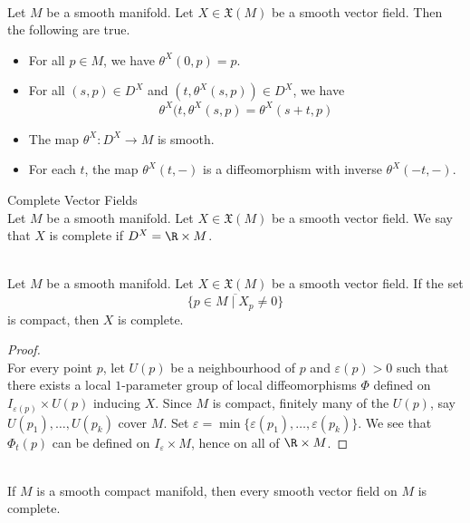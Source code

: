 \documentclass[a4paper]{article}
\begin{document}
\begin{prp}{}{}\\
Let $M$ be a smooth manifold. Let $X\in\mathfrak{X}(M)$ be a smooth vector field. Then the following are true. 
\begin{itemize}
\item For all $p\in M$, we have $\theta^X(0,p)=p$. 
\item For all $(s,p)\in D^X$ and $(t,\theta^X(s,p))\in D^X$, we have $$\theta^X(t,\theta^X(s,p)=\theta^X(s+t,p)$$
\item The map $\theta^X:D^X\to M$ is smooth. 
\item For each $t$, the map $\theta^X(t,-)$ is a diffeomorphism with inverse $\theta^X(-t,-)$. 
\end{itemize}
\end{prp}

\begin{defn}{Complete Vector Fields}{}\\
Let $M$ be a smooth manifold. Let $X\in\mathfrak{X}(M)$ be a smooth vector field. We say that $X$ is complete if $D^X=\R\times M$. 
\end{defn}

\begin{prp}{}{}\\
Let $M$ be a smooth manifold. Let $X\in\mathfrak{X}(M)$ be a smooth vector field. If the set $$\overline{\{p\in M\;|\;X_p\neq 0\}}$$ is compact, then $X$ is complete. 
\begin{proof}\\
For every point $p$, let $U(p)$ be a neighbourhood of $p$ and $\varepsilon(p)>0$ such that there exists a local $1$-parameter group of local diffeomorphisms $\Phi$ defined on $I_{\varepsilon(p)}\times U(p)$ inducing $X$. Since $M$ is compact, finitely many of the $U(p)$, say $U(p_1),\dots,U(p_k)$ cover $M$. Set $\varepsilon=\min\{\varepsilon(p_1),\dots,\varepsilon(p_k)\}$. We see that $\Phi_t(p)$ can be defined on $I_\varepsilon\times M$, hence on all of $\R\times M$. 
\end{proof}
\end{prp}

\begin{crl}{}{}\\
If $M$ is a smooth compact manifold, then every smooth vector field on $M$ is complete. 
\end{crl}
\end{document}
